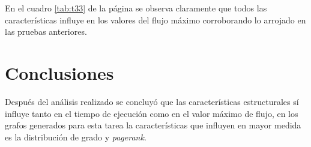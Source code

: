 \documentclass{article}
\begin{document}
En el cuadro \ref{tab:t33} de la página \pageref{tab:t33} se observa claramente que todos las características influye en los valores del flujo máximo corroborando lo arrojado en las pruebas anteriores.
\section{Conclusiones}

Después del análisis realizado se concluyó que las características estructurales sí influye tanto en el tiempo de ejecución como en el valor máximo de flujo, en los grafos generados para esta tarea la características que influyen en mayor medida es la distribución de grado y \textit{pagerank}.

\newpage


\end{document}
